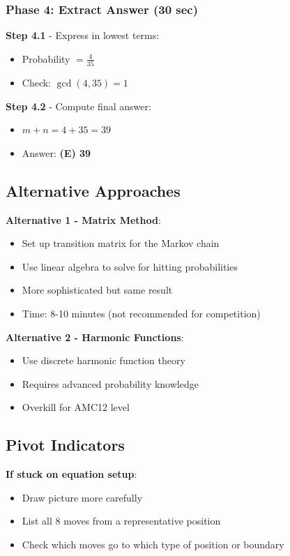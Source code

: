 \documentclass[12pt]{article}
\begin{document}
\begin{roadmapbox}
\subsubsection*{Phase 4: Extract Answer (30 sec)}

\textbf{Step 4.1} - Express in lowest terms:
\begin{itemize}[leftmargin=*]
    \item Probability $= \frac{4}{35}$
    \item Check: $\gcd(4, 35) = 1$ \checkmark
\end{itemize}

\textbf{Step 4.2} - Compute final answer:
\begin{itemize}[leftmargin=*]
    \item $m + n = 4 + 35 = 39$
    \item Answer: \textbf{(E) 39}
\end{itemize}

\subsection*{Alternative Approaches}

\textbf{Alternative 1 - Matrix Method}:
\begin{itemize}[leftmargin=*]
    \item Set up transition matrix for the Markov chain
    \item Use linear algebra to solve for hitting probabilities
    \item More sophisticated but same result
    \item Time: 8-10 minutes (not recommended for competition)
\end{itemize}

\textbf{Alternative 2 - Harmonic Functions}:
\begin{itemize}[leftmargin=*]
    \item Use discrete harmonic function theory
    \item Requires advanced probability knowledge
    \item Overkill for AMC12 level
\end{itemize}

\subsection*{Pivot Indicators}

\textbf{If stuck on equation setup}:
\begin{itemize}[leftmargin=*]
    \item Draw picture more carefully
    \item List all 8 moves from a representative position
    \item Check which moves go to which type of position or boundary
\end{itemize}


\end{roadmapbox}
\end{document}
